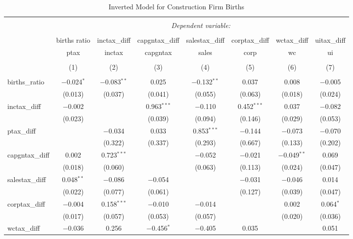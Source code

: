 
\begin{table}[!htbp] \centering 
  \caption{Inverted Model for  Construction Firm Births} 
  \label{23rd} 
\footnotesize 
\begin{tabular}{@{\extracolsep{5pt}}lccccccc} 
\\[-1.8ex]\hline 
\hline \\[-1.8ex] 
 & \multicolumn{7}{c}{\textit{Dependent variable:}} \\ 
\cline{2-8} 
\\[-1.8ex] & births ratio & inctax\_diff & capgntax\_diff & salestax\_diff & corptax\_diff & wctax\_diff & uitax\_diff \\ 
 & ptax & inctax & capgntax & sales & corp & wc & ui \\ 
\\[-1.8ex] & (1) & (2) & (3) & (4) & (5) & (6) & (7)\\ 
\hline \\[-1.8ex] 
 births\_ratio & $-$0.024$^{*}$ & $-$0.083$^{**}$ & 0.025 & $-$0.132$^{**}$ & 0.037 & 0.008 & $-$0.005 \\ 
  & (0.013) & (0.037) & (0.041) & (0.055) & (0.063) & (0.018) & (0.024) \\ 
  inctax\_diff & $-$0.002 &  & 0.963$^{***}$ & $-$0.110 & 0.452$^{***}$ & 0.037 & $-$0.082 \\ 
  & (0.023) &  & (0.039) & (0.094) & (0.146) & (0.029) & (0.053) \\ 
  ptax\_diff &  & $-$0.034 & 0.033 & 0.853$^{***}$ & $-$0.144 & $-$0.073 & $-$0.070 \\ 
  &  & (0.322) & (0.337) & (0.293) & (0.667) & (0.133) & (0.202) \\ 
  capgntax\_diff & 0.002 & 0.723$^{***}$ &  & $-$0.052 & $-$0.021 & $-$0.049$^{**}$ & 0.069 \\ 
  & (0.018) & (0.060) &  & (0.063) & (0.113) & (0.024) & (0.047) \\ 
  salestax\_diff & 0.048$^{**}$ & $-$0.086 & $-$0.054 &  & $-$0.031 & $-$0.046 & 0.014 \\ 
  & (0.022) & (0.077) & (0.061) &  & (0.127) & (0.039) & (0.047) \\ 
  corptax\_diff & $-$0.004 & 0.158$^{***}$ & $-$0.010 & $-$0.014 &  & 0.002 & 0.064$^{*}$ \\ 
  & (0.017) & (0.057) & (0.053) & (0.057) &  & (0.020) & (0.036) \\ 
  wctax\_diff & $-$0.036 & 0.256 & $-$0.456$^{*}$ & $-$0.405 & 0.035 &  & 0.051 \\ 

\end{tabular}
\end{table}
